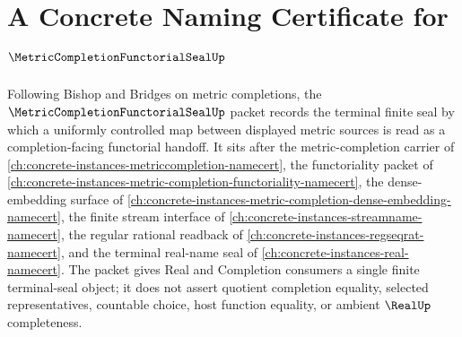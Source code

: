 \chapter{A Concrete Naming Certificate for $\MetricCompletionFunctorialSealUp$}
\label{ch:concrete-instances-metric-completion-functorial-seal-namecert}

Following Bishop and Bridges on metric completions, the $\MetricCompletionFunctorialSealUp$ packet records the terminal finite seal by which a uniformly controlled map between displayed metric sources is read as a completion-facing functorial handoff. It sits after the metric-completion carrier of \autoref{ch:concrete-instances-metriccompletion-namecert}, the functoriality packet of \autoref{ch:concrete-instances-metric-completion-functoriality-namecert}, the dense-embedding surface of \autoref{ch:concrete-instances-metric-completion-dense-embedding-namecert}, the finite stream interface of \autoref{ch:concrete-instances-streamname-namecert}, the regular rational readback of \autoref{ch:concrete-instances-regseqrat-namecert}, and the terminal real-name seal of \autoref{ch:concrete-instances-real-namecert}. The packet gives Real and Completion consumers a single finite terminal-seal object; it does not assert quotient completion equality, selected representatives, countable choice, host function equality, or ambient $\RealUp$ completeness.


